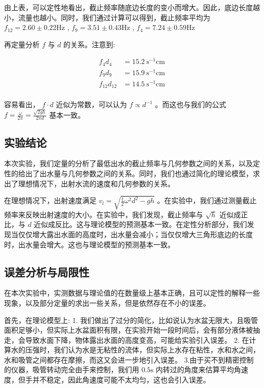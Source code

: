 \documentclass[fontset=windows]{article}
\begin{document}
由上表，可以定性地看出，截止频率随底边长度的变小而增大。因此，底边长度越小，流量也越小。同时，我们通过计算可以得到，截止频率平均为 $f_{12} = 2.60 \pm 0.22 \text{Hz} $ , $f_9 = 3.51 \pm 0.43 \text{Hz}$ , $f_{4} = 7.24 \pm 0.59 \text{Hz}$

再定量分析 $f$ 与 $d$ 的关系。注意到:

$$
\begin{aligned}
    {f_4}{d_4} &= 15.2 \ \text{s}^{-1} \text{cm} \\
    {f_9}{d_9} &= 15.9 \ \text{s}^{-1} \text{cm} \\
    {f_{12}}{d_{12}} &= 14.5 \ \text{s}^{-1} \text{cm} \\
\end{aligned}
$$

容易看出， $f \cdot d$ 近似为常数，可以认为 $f \propto d^{-1}$ 。而这也与我们的公式 $f = \frac{\omega}{2\pi} = \frac{\sqrt{2gh}}{2\pi d}$ 基本一致。


\subsection{实验结论}

本次实验，我们定量的分析了最低出水的截止频率与几何参数之间的关系，以及定性的给出了出水量与几何参数之间的关系。同时，我们也通过简化的理论模型，求出了理想情况下，出射水流的速度和几何参数的关系。

在理想情况下，出射速度满足 $v_l = \sqrt{\frac{1}{2}\omega^2 d^2 - gh}$ 。在实验中，我们通过测量截止频率来反映出射速度的大小。在实验中，我们发现，截止频率与 $\sqrt{h}$ 近似成正比，与 $d$ 近似成反比。这与理论模型的预测基本一致。在定性分析部分，我们发现当仅仅增大露出水面的高度时，出水量会减小；当仅仅增大三角形底边的长度时，出水量会增大。这也与理论模型的预测基本一致。

\subsection{误差分析与局限性}

在本次实验中，实测数据与理论值的在数量级上基本正确，且可以定性的解释一些现象，以及部分定量的求出一些关系，但是依然存在不小的误差。

首先，在理论模型上:  1. 我们做出了过分的简化，比如说认为水盆无限大，且吸管面积足够小，但实际上水盆面积有限，在实验开始一段时间后，会有部分液体被抽走，会导致水面下降，物体露出水面的高度变高，可能给实验引入误差。 2. 在计算水的压强时，我们认为水是无粘性的流体，但实际上水存在粘性，水和水之间，水和吸管之间都存在摩擦，而这又会进一步地引入误差。 3.由于买不到精密控制的仪器，吸管转动完全由手来控制，我们用 $0.5\text{s}$ 内转过的角度来估算平均角速度，但手并不稳定，因此角速度可能不太均匀，这也会引入误差。
\end{document}
